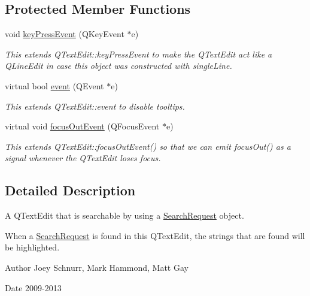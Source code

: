 \subsection*{Protected Member Functions}
\begin{DoxyCompactItemize}
\item 
void \hyperlink{class_searchable_text_edit_aedeebdabab6c6865ca8aaa1429967b2a}{key\-Press\-Event} (Q\-Key\-Event $\ast$e)
\begin{DoxyCompactList}\small\item\em This extends Q\-Text\-Edit\-::key\-Press\-Event to make the Q\-Text\-Edit act like a Q\-Line\-Edit in case this object was constructed with single\-Line. \end{DoxyCompactList}\item 
\hypertarget{class_searchable_text_edit_a6acd591f685268d3897feeb7fbd7e579}{virtual bool \hyperlink{class_searchable_text_edit_a6acd591f685268d3897feeb7fbd7e579}{event} (Q\-Event $\ast$e)}\label{class_searchable_text_edit_a6acd591f685268d3897feeb7fbd7e579}

\begin{DoxyCompactList}\small\item\em This extends Q\-Text\-Edit\-::event to disable tooltips. \end{DoxyCompactList}\item 
\hypertarget{class_searchable_text_edit_a8622cfa9536e40d76cfb1fb84f7ffc7c}{virtual void \hyperlink{class_searchable_text_edit_a8622cfa9536e40d76cfb1fb84f7ffc7c}{focus\-Out\-Event} (Q\-Focus\-Event $\ast$e)}\label{class_searchable_text_edit_a8622cfa9536e40d76cfb1fb84f7ffc7c}

\begin{DoxyCompactList}\small\item\em This extends Q\-Text\-Edit\-::focus\-Out\-Event() so that we can emit focus\-Out() as a signal whenever the Q\-Text\-Edit loses focus. \end{DoxyCompactList}\end{DoxyCompactItemize}


\subsection{Detailed Description}
A Q\-Text\-Edit that is searchable by using a \hyperlink{struct_search_request}{Search\-Request} object. 

When a \hyperlink{struct_search_request}{Search\-Request} is found in this Q\-Text\-Edit, the strings that are found will be highlighted. \begin{DoxyAuthor}{Author}
Joey Schnurr, Mark Hammond, Matt Gay 
\end{DoxyAuthor}
\begin{DoxyDate}{Date}
2009-\/2013 
\end{DoxyDate}


